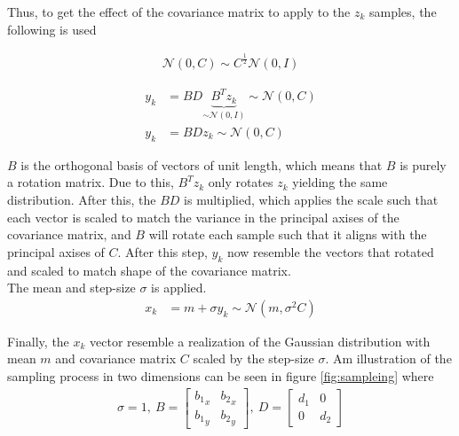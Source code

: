 Thus, to get the effect of the covariance matrix to apply to the $z_k$
samples, the following is used

\begin{align}
\mathcal{N}\left( 0, C \right) \sim C^{\frac{1}{2}} \mathcal{N}\left( 0, I \right)
\end{align}

\begin{align}
y_{k} &= B D \underbrace{B^{T} z_{k}}_{\sim \mathcal{N}(0, I)} \sim \mathcal{N}(0, C)\\
y_{k} &= B Dz_{k} \sim \mathcal{N}(0, C) \label{eq:sampley}
\end{align}

$B$ is the orthogonal basis of vectors of unit length, which means that 
$B$ is purely a rotation matrix. Due to this, $B^{T} z_{k}$ only rotates
$z_k$ yielding the same distribution. After this, the $BD$ is multiplied,
which applies the scale such that each vector is scaled to match the
variance in the principal axises of the covariance matrix, and $B$ 
will rotate each sample such that it aligns with the principal axises
of $C$. After this step, $y_{k}$ now resemble the vectors that rotated and scaled
to match shape of the covariance matrix.\\

The mean and step-size $\sigma$ is applied.
\begin{align}
x_{k} &= m + \sigma y_{k} \sim \mathcal{N}(m, \sigma^2 C) \label{eq:finalSample}
\end{align}



Finally, the $x_{k}$ vector resemble a realization of the Gaussian distribution
with mean $m$ and covariance matrix $C$ scaled by the step-size $\sigma$.
Am illustration of the sampling process in two dimensions can be seen in figure \ref{fig:sampleing} where 
\begin{align}
\sigma = 1,\ B = \begin{bmatrix}
{b_1}_x & {b_2}_x\\
{b_1}_y & {b_2}_y
\end{bmatrix},\ D = \begin{bmatrix}
d_1 & 0\\
0   & d_2
\end{bmatrix}
\end{align}


